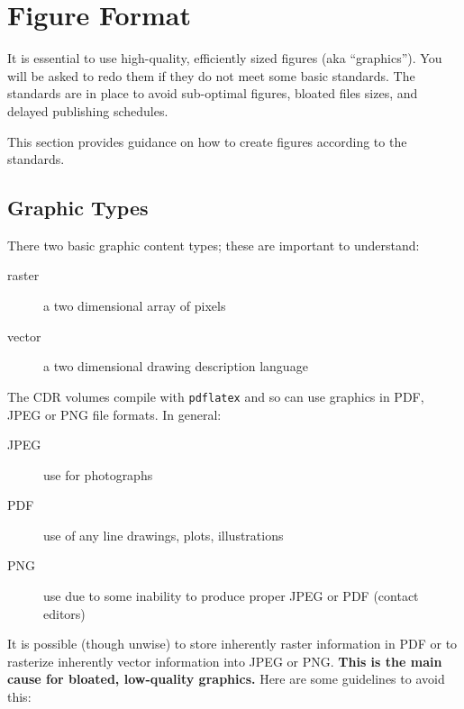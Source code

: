 \section{Figure Format}
\label{sec:figure-format}

It is essential to use high-quality, efficiently sized figures (aka ``graphics'').  You will be asked to redo 
them if they do not meet some basic standards.   
The standards are in place to avoid sub-optimal figures, bloated files sizes, and delayed publishing schedules.  

This section provides guidance on how to create figures 
according to the standards.

\subsection{Graphic Types}
\label{sec:graphic-types}

There two basic graphic content types; these are important to understand:

\begin{description}
\item[raster] a two dimensional array of pixels
\item[vector] a two dimensional drawing description language
\end{description}

The CDR volumes compile with \texttt{pdflatex} and so can use graphics in PDF, JPEG or PNG file formats.  In general:

\begin{description}
\item[JPEG] use for photographs
\item[PDF] use of any line drawings, plots, illustrations
\item[PNG] use due to some inability to produce proper JPEG or PDF (contact editors)
\end{description}

It is possible (though unwise) to store inherently raster information in PDF or to rasterize inherently vector information into JPEG or PNG.  \textbf{This is the main cause for bloated, low-quality graphics.}  Here are some guidelines to avoid this:

